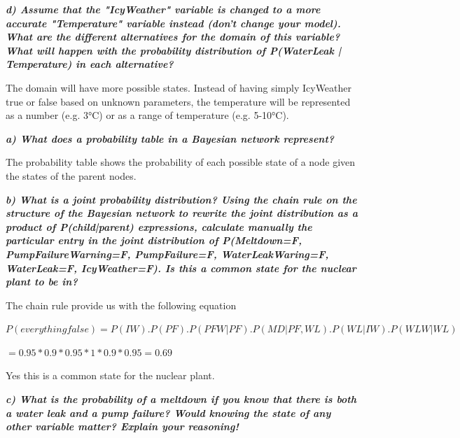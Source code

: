 \textit{\textbf{d) Assume that the "IcyWeather" variable is changed to a more accurate
"Temperature" variable instead (don't change your model). What are the different
 alternatives for the domain of this variable? What will happen with the
 probability distribution of P(WaterLeak | Temperature) in each alternative? }}

 \vspace{1em}

The domain will have more possible states. Instead of having simply IcyWeather true or
false based on unknown parameters, the temperature will be represented as a
number (e.g. 3°C) or as a range of temperature (e.g. 5-10°C).



\newpage
\thispagestyle{empty}

\textit{\textbf{a) What does a probability table in a Bayesian network represent?}}

\vspace{1em}

The probability table shows the probability of each possible state of a node given
the states of the parent nodes.


\textit{\textbf{b) What is a joint probability distribution? Using the chain
rule on the structure of the Bayesian network to rewrite the joint distribution
as a product of P(child|parent) expressions, calculate manually the particular
entry in the joint distribution of P(Meltdown=F, PumpFailureWarning=F,
PumpFailure=F, WaterLeakWaring=F, WaterLeak=F, IcyWeather=F).
Is this a common state for the nuclear plant to be in?}}

\vspace{1em}

The chain rule provide us with the following equation

$P(everything false) = P(IW).P(PF).P(PFW|PF).P(MD|PF, WL).P(WL|IW).P(WLW|WL)$

\hspace{9em}$= 0.95 * 0.9 * 0.95 * 1 * 0.9 * 0.95 = 0.69$

Yes this is a common state for the nuclear plant.

\textit{\textbf{c) What is the probability of a meltdown if you know that there
is both a water leak and a pump failure? Would knowing the state of any other
 variable matter? Explain your reasoning!}}

 \vspace{1em}

